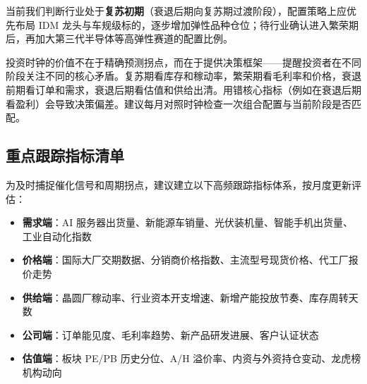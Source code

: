 \begin{exhibitbox}[图 11-3：功率半导体投资时钟]
\end{exhibitbox}

当前我们判断行业处于\textbf{复苏初期}（衰退后期向复苏期过渡阶段），配置策略上应优先布局 IDM 龙头与车规级标的，逐步增加弹性品种仓位；待行业确认进入繁荣期后，再加大第三代半导体等高弹性赛道的配置比例。

\begin{keyinsight}[投资时钟的实操要点]
投资时钟的价值不在于精确预测拐点，而在于提供决策框架——提醒投资者在不同阶段关注不同的核心矛盾。复苏期看库存和稼动率，繁荣期看毛利率和价格，衰退前期看订单和需求，衰退后期看估值和供给出清。用错核心指标（例如在衰退后期看盈利）会导致决策偏差。建议每月对照时钟检查一次组合配置与当前阶段是否匹配。
\end{keyinsight}

\subsection{重点跟踪指标清单}

为及时捕捉催化信号和周期拐点，建议建立以下高频跟踪指标体系，按月度更新评估：

\vspace{0.2em}
\begin{itemize}[leftmargin=2em]
\item \textbf{需求端}：AI 服务器出货量、新能源车销量、光伏装机量、智能手机出货量、工业自动化指数
\item \textbf{价格端}：国际大厂交期数据、分销商价格指数、主流型号现货价格、代工厂报价走势
\item \textbf{供给端}：晶圆厂稼动率、行业资本开支增速、新增产能投放节奏、库存周转天数
\item \textbf{公司端}：订单能见度、毛利率趋势、新产品研发进展、客户认证状态
\item \textbf{估值端}：板块 PE/PB 历史分位、A/H 溢价率、内资与外资持仓变动、龙虎榜机构动向
\end{itemize}
